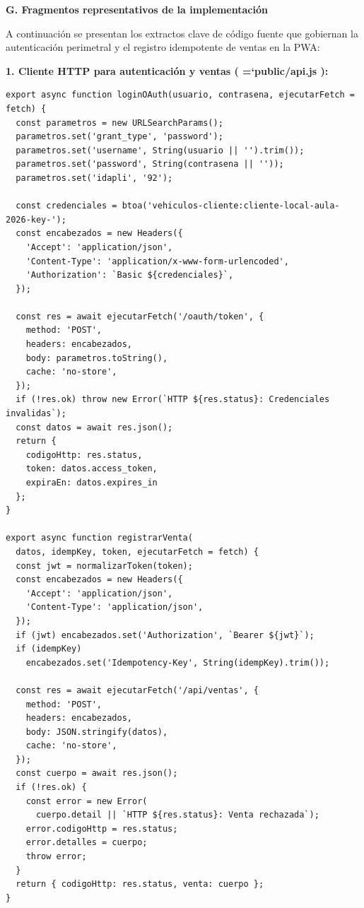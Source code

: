 \documentclass[11pt,a4paper]{article}
\renewcommand{\_}{\oldunderscore\allowbreak}
\DeclareRobustCommand{\texttt}[1]{%
  {\upshape\ttfamily\fontsize{9}{10.8}\selectfont\hyphenchar\font=`\-\relax #1}%
}
\begin{document}
\vspace{0.2cm}
\noindent\textbf{G. Fragmentos representativos de la implementación}

\noindent A continuación se presentan los extractos clave de código fuente que gobiernan la autenticación perimetral y el registro idempotente de ventas en la PWA:

\vspace{0.1cm}
\noindent\textbf{1. Cliente HTTP para autenticación y ventas (\texttt{public/\allowbreak{}api.\allowbreak{}js}):}
\begin{lstlisting}
export async function loginOAuth(usuario, contrasena, ejecutarFetch = fetch) {
  const parametros = new URLSearchParams();
  parametros.set('grant_type', 'password');
  parametros.set('username', String(usuario || '').trim());
  parametros.set('password', String(contrasena || ''));
  parametros.set('idapli', '92');

  const credenciales = btoa('vehiculos-cliente:cliente-local-aula-2026-key-');
  const encabezados = new Headers({
    'Accept': 'application/json',
    'Content-Type': 'application/x-www-form-urlencoded',
    'Authorization': `Basic ${credenciales}`,
  });

  const res = await ejecutarFetch('/oauth/token', {
    method: 'POST',
    headers: encabezados,
    body: parametros.toString(),
    cache: 'no-store',
  });
  if (!res.ok) throw new Error(`HTTP ${res.status}: Credenciales invalidas`);
  const datos = await res.json();
  return {
    codigoHttp: res.status,
    token: datos.access_token,
    expiraEn: datos.expires_in
  };
}

export async function registrarVenta(
  datos, idempKey, token, ejecutarFetch = fetch) {
  const jwt = normalizarToken(token);
  const encabezados = new Headers({
    'Accept': 'application/json',
    'Content-Type': 'application/json',
  });
  if (jwt) encabezados.set('Authorization', `Bearer ${jwt}`);
  if (idempKey)
    encabezados.set('Idempotency-Key', String(idempKey).trim());

  const res = await ejecutarFetch('/api/ventas', {
    method: 'POST',
    headers: encabezados,
    body: JSON.stringify(datos),
    cache: 'no-store',
  });
  const cuerpo = await res.json();
  if (!res.ok) {
    const error = new Error(
      cuerpo.detail || `HTTP ${res.status}: Venta rechazada`);
    error.codigoHttp = res.status;
    error.detalles = cuerpo;
    throw error;
  }
  return { codigoHttp: res.status, venta: cuerpo };
}
\end{lstlisting}
\end{document}
